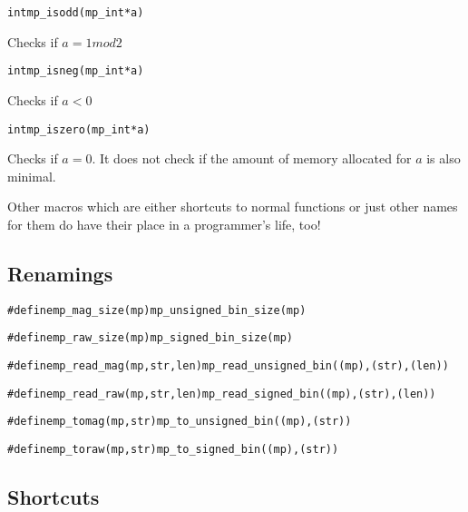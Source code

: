\documentclass[synpaper]{book}
\begin{document}
\begin{alltt}
int mp_isodd(mp_int *a)
\end{alltt}
Checks if $a = 1 mod 2$

\begin{alltt}
int mp_isneg(mp_int *a)
\end{alltt}
Checks if $a < 0$


\begin{alltt}
int mp_iszero(mp_int *a)
\end{alltt}
Checks if $a = 0$. It does not check if the amount of memory allocated for $a$ is also minimal.


Other macros which are either shortcuts to normal functions or just other names for them do have their place in a programmer's life, too!

\subsection{Renamings}
\begin{alltt}
#define mp_mag_size(mp) mp_unsigned_bin_size(mp)
\end{alltt}


\begin{alltt}
#define mp_raw_size(mp) mp_signed_bin_size(mp)
\end{alltt}


\begin{alltt}
#define mp_read_mag(mp, str, len) mp_read_unsigned_bin((mp), (str), (len))
\end{alltt}


\begin{alltt}
 #define mp_read_raw(mp, str, len) mp_read_signed_bin((mp), (str), (len))
\end{alltt}


\begin{alltt}
#define mp_tomag(mp, str) mp_to_unsigned_bin((mp), (str))
\end{alltt}


\begin{alltt}
#define mp_toraw(mp, str)         mp_to_signed_bin((mp), (str))
\end{alltt}



\subsection{Shortcuts}
\end{document}
